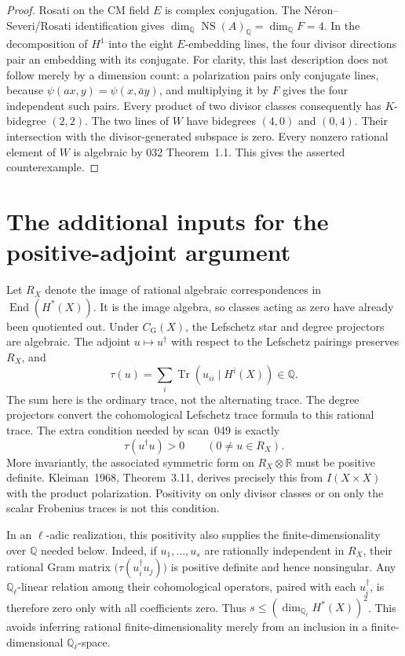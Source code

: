 \begin{proof}
Rosati on the CM field $E$ is complex conjugation.  The
N\'eron--Severi/Rosati identification
\cite[Proposition~13.1]{MilneAV} gives
$\dim_{\mathbb Q}\operatorname{NS}(A)_{\mathbb Q}=\dim_{\mathbb Q}F=4$.
In the decomposition of $H^1$ into the eight $E$-embedding lines,
the four divisor directions pair an embedding with its conjugate.
For clarity, this last description does not follow merely by a dimension
count: a polarization pairs only conjugate lines, because
$\psi(ax,y)=\psi(x,\bar a y)$, and multiplying it by $F$ gives the four
independent such pairs.  Every product of two divisor classes consequently
has $K$-bidegree $(2,2)$.  The two lines of $W$ have bidegrees $(4,0)$ and
$(0,4)$.  Their intersection with the divisor-generated subspace is zero.
Every nonzero rational element of $W$ is algebraic by 032 Theorem~1.1.
This gives the asserted counterexample.
\end{proof}

\section{The additional inputs for the positive-adjoint argument}
\label{sec:positive}

Let $R_X$ denote the image of rational algebraic correspondences in
$\operatorname{End}(H^*(X))$.  It is the image algebra, so classes acting
as zero have already been quotiented out.  Under $C_{\mathrm G}(X)$,
the Lefschetz star and degree projectors are algebraic.  The adjoint
$u\mapsto u^\dagger$ with respect to the Lefschetz pairings preserves
$R_X$, and
\[
  \tau(u)=\sum_i\operatorname{Tr}(u_{ii}\mid H^i(X))\in\mathbb Q.
\]
The sum here is the ordinary trace, not the alternating trace.  The degree
projectors convert the cohomological Lefschetz trace formula to this
rational trace.  The extra condition needed by scan~049 is exactly
\begin{equation}\label{eq:positive-trace}
             \tau(u^\dagger u)>0\qquad(0\ne u\in R_X).
\end{equation}
More invariantly, the associated symmetric form on $R_X\otimes\mathbb R$
must be positive definite.  Kleiman~1968, Theorem~3.11, derives precisely
this from $I(X\times X)$ with the product polarization.  Positivity on
only divisor classes or on only the scalar Frobenius traces is not this
condition.

In an $\ell$-adic realization, this positivity also supplies the
finite-dimensionality over $\mathbb Q$ needed below. Indeed, if
$u_1,\ldots,u_s$ are rationally independent in $R_X$, their rational
Gram matrix $\bigl(\tau(u_i^\dagger u_j)\bigr)$ is positive definite
and hence nonsingular. Any $\mathbb Q_\ell$-linear relation among
their cohomological operators, paired with each $u_i^\dagger$, is
therefore zero only with all coefficients zero. Thus
$s\le(\dim_{\mathbb Q_\ell}H^*(X))^2$. This avoids inferring
rational finite-dimensionality merely from an inclusion in a
finite-dimensional $\mathbb Q_\ell$-space.

